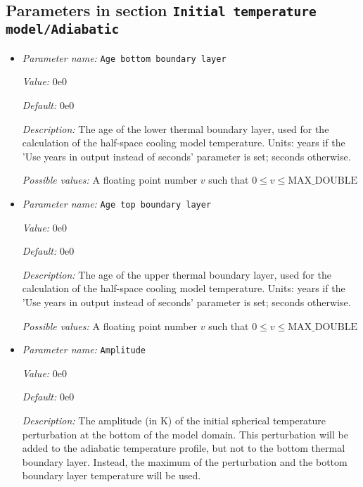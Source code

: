 \subsection{Parameters in section \tt Initial temperature model/Adiabatic}
\label{parameters:Initial_20temperature_20model/Adiabatic}

\begin{itemize}
\item {\it Parameter name:} {\tt Age bottom boundary layer}
\label{parameters:Initial temperature model/Adiabatic/Age bottom boundary layer}


{\it Value:} 0e0


{\it Default:} 0e0


{\it Description:} The age of the lower thermal boundary layer, used for the calculation of the half-space cooling model temperature. Units: years if the 'Use years in output instead of seconds' parameter is set; seconds otherwise.


{\it Possible values:} A floating point number $v$ such that $0 \leq v \leq \text{MAX\_DOUBLE}$
\item {\it Parameter name:} {\tt Age top boundary layer}
\label{parameters:Initial temperature model/Adiabatic/Age top boundary layer}


{\it Value:} 0e0


{\it Default:} 0e0


{\it Description:} The age of the upper thermal boundary layer, used for the calculation of the half-space cooling model temperature. Units: years if the 'Use years in output instead of seconds' parameter is set; seconds otherwise.


{\it Possible values:} A floating point number $v$ such that $0 \leq v \leq \text{MAX\_DOUBLE}$
\item {\it Parameter name:} {\tt Amplitude}
\label{parameters:Initial temperature model/Adiabatic/Amplitude}


{\it Value:} 0e0


{\it Default:} 0e0


{\it Description:} The amplitude (in K) of the initial spherical temperature perturbation at the bottom of the model domain. This perturbation will be added to the adiabatic temperature profile, but not to the bottom thermal boundary layer. Instead, the maximum of the perturbation and the bottom boundary layer temperature will be used.



\end{itemize}
